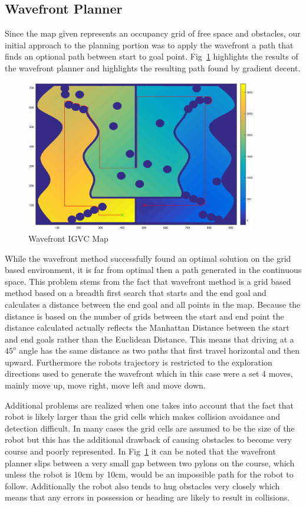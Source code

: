 \documentclass{article}
\begin{document}
\subsection{Wavefront Planner}
\label{subsec:wavefront}
Since the map given represents an occupancy grid of free space and obstacles, our initial approach to the planning portion was to apply the wavefront a path that finds an optional path between start to goal point. Fig~\ref{fig:wavefront} highlights the results of the wavefront planner and highlights the resulting path found by gradient decent. 
\begin{figure}[H]
	\centering
	\includegraphics[width=0.9\textwidth]{images/wavefront_igvc.eps}
	\caption{Wavefront IGVC Map}
	\label{fig:wavefront}
\end{figure}

While the wavefront method successfully found an optimal solution on the grid based environment, it is far from optimal then a path generated in the continuous space. This problem stems from the fact that wavefront method is a grid based method based on a breadth first search that starts and the end goal and calculates a distance between the end goal and all points in the map. Because the distance is based on the number of grids between the start and end point the distance calculated actually reflects the Manhattan Distance between the start and end goals rather than the Euclidean Distance. This means that driving at a $45^o $ angle has the same distance as two paths that first travel horizontal and then upward. Furthermore the robots trajectory is restricted to the exploration directions used to generate the wavefront which in this case were a set 4 moves, mainly move up, move right, move left and move down. 

Additional problems are realized when one takes into account that the fact that robot is likely larger than the grid cells which makes collision avoidance and detection difficult. In many cases the grid cells are assumed to be the size of the robot but this has the additional drawback of causing obstacles to become very course and poorly represented. In Fig~\ref{fig:wavefront} it can be noted that the wavefront planner slips between a very small gap between two pylons on the course, which unless the robot is 10cm by 10cm, would be an impossible path for the robot to follow. Additionally the robot also tends to hug obstacles very closely which means that any errors in possession or heading are likely to result in collisions. 
\end{document}
